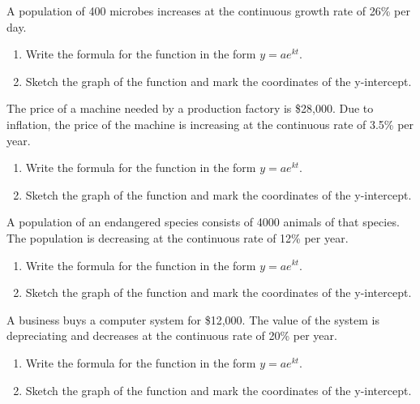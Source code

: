 \begin{puzzle}
    A population of 400 microbes increases at the continuous growth rate of 26\% per day.
    \begin{enumerate}
        \item Write the formula for the function in the form \( y = ae^{kt} \).
        \item Sketch the graph of the function and mark the coordinates of the y-intercept.
    \end{enumerate}
\end{puzzle}

\begin{puzzle}
    The price of a machine needed by a production factory is \$28,000. Due to inflation, the price of the machine is increasing at the continuous rate of 3.5\% per year.
    \begin{enumerate}
        \item Write the formula for the function in the form \( y = ae^{kt} \).
        \item Sketch the graph of the function and mark the coordinates of the y-intercept.
    \end{enumerate}
\end{puzzle}

\begin{puzzle}
    A population of an endangered species consists of 4000 animals of that species. The population is decreasing at the continuous rate of 12\% per year.
    \begin{enumerate}
        \item Write the formula for the function in the form \( y = ae^{kt} \).
        \item Sketch the graph of the function and mark the coordinates of the y-intercept.
    \end{enumerate}
\end{puzzle}

\begin{puzzle}
    A business buys a computer system for \$12,000. The value of the system is depreciating and decreases at the continuous rate of 20\% per year.
    \begin{enumerate}
        \item Write the formula for the function in the form \( y = ae^{kt} \).
        \item Sketch the graph of the function and mark the coordinates of the y-intercept.
    \end{enumerate}
\end{puzzle}


